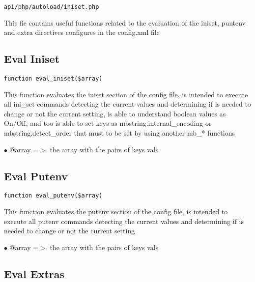 \documentclass[a4paper]{book}
\begin{document}
\begin{lstlisting}
api/php/autoload/iniset.php
\end{lstlisting}

This fie contains useful functions related to the evaluation of the iniset, puntenv and extra
directives configures in the config.xml file

\hypertarget{toc191}{}
\subsection{Eval Iniset}

\begin{lstlisting}
function eval_iniset($array)
\end{lstlisting}

This function evaluates the iniset section of the config file, is intended
to execute all ini\_set commands detecting the current values and determining
if is needed to change or not the current setting, is able to understand
boolean values as On/Off, and too is able to set keys as mbstring.internal\_encoding
or mbstring.detect\_order that must to be set by using another mb\_* functions

\begin{compactitem}
\item[\color{myblue}$\bullet$] @array =$>$ the array with the pairs of keys vals
\end{compactitem}

\hypertarget{toc192}{}
\subsection{Eval Putenv}

\begin{lstlisting}
function eval_putenv($array)
\end{lstlisting}

This function evaluates the putenv section of the config file, is intended
to execute all putenv commands detecting the current values and determining
if is needed to change or not the current setting

\begin{compactitem}
\item[\color{myblue}$\bullet$] @array =$>$ the array with the pairs of keys vals
\end{compactitem}

\hypertarget{toc193}{}
\subsection{Eval Extras}
\end{document}
